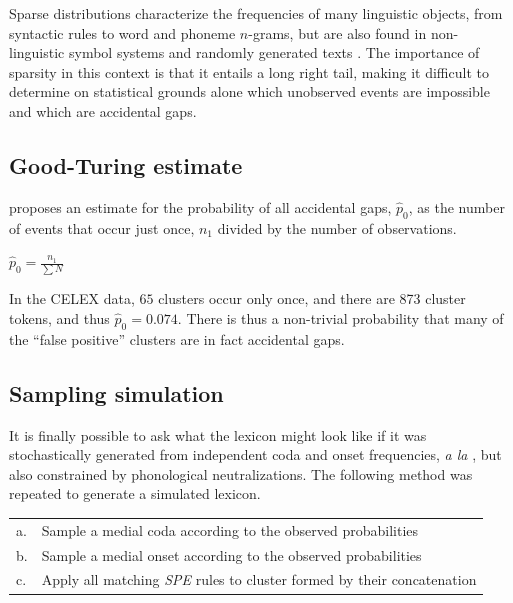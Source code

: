 Sparse distributions characterize the frequencies of many linguistic objects, from syntactic rules \citep{Yang2011b} to word \citep{Baroni2009} and phoneme \citep{Belevitch1956,Daland2011a} $n$-grams, but are also found in non-linguistic symbol systems \citep{Mandelbrot1954,Miller1957,Chomsky1958,Sproat2010} and randomly generated texts \citep{Miller1957,Li1992}. The importance of sparsity in this context is that it entails a long right tail, making it difficult to determine on statistical grounds alone which unobserved events are impossible and which are accidental gaps.

\subsection{Good-Turing estimate}

\citet{Good1953} proposes an estimate for the probability of all accidental gaps, $\hat{p}_0$, as the number of events that occur just once, $n_1$ divided by the number of observations.

\begin{unlabeledexample}
$\displaystyle \hat{p}_0 = \frac{n_1}{\displaystyle\sum N}$
\end{unlabeledexample}

\noindent In the CELEX data, $65$ clusters occur only once, and there are 873 cluster tokens, and thus $\hat{p}_0 = 0.074$. There is thus a non-trivial probability that many of the ``false positive'' clusters are in fact accidental gaps.

\subsection{Sampling simulation}

It is finally possible to ask what the lexicon might look like if it was stochastically generated from independent coda and onset frequencies, \emph{a la} \citeauthor{Pierrehumbert1994}, but also constrained by phonological neutralizations. The following method was repeated to generate a simulated lexicon.

\begin{example}
\begin{tabular}{l l}
a. & Sample a medial coda according to the observed probabilities  \\
b. & Sample a medial onset according to the observed probabilities \\
c. & Apply all matching \emph{SPE} rules to cluster formed by their concatenation \\
\end{tabular}
\end{example}


